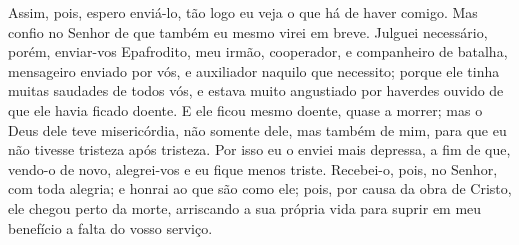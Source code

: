 {Assim, pois, espero enviá-lo, tão logo eu veja o que há de haver comigo.
Mas confio no Senhor de que também eu mesmo virei em breve.
Julguei necessário, porém, enviar-vos Epafrodito, meu irmão, cooperador, e companheiro de batalha, mensageiro enviado por vós, e auxiliador naquilo que necessito;
porque ele tinha muitas saudades de todos vós, e estava muito angustiado por haverdes ouvido de que ele havia ficado doente.
E ele ficou mesmo doente, quase a morrer; mas o Deus dele teve misericórdia, não somente dele, mas também de mim, para que eu não tivesse tristeza após tristeza.
Por isso eu o enviei mais depressa, a fim de que, vendo-o de novo, alegrei-vos e eu fique menos triste.
Recebei-o, pois, no Senhor, com toda alegria; e honrai ao que são como ele;
pois, por causa da obra de Cristo, ele chegou perto da morte, arriscando a sua própria vida para suprir em meu benefício a falta do vosso serviço.

}
